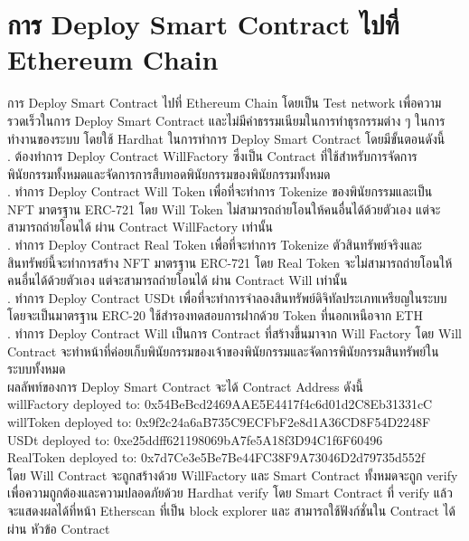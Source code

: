 \documentclass[12pt,oneside,openright,a4paper]{cpe-thai-project}
\begin{document}
\section{การ Deploy Smart Contract ไปที่ Ethereum Chain}
	\tab การ Deploy Smart Contract ไปที่ Ethereum Chain โดยเป็น Test network เพื่อความรวดเร็วในการ Deploy Smart Contract และไม่มีค่าธรรมเนียมในการทำธุรกรรมต่าง ๆ ในการทำงานของระบบ โดยใช้ Hardhat ในการทำการ Deploy Smart Contract โดยมีขั้นตอนดังนี้
	\\. ต้องทำการ Deploy Contract WillFactory ซึ่งเป็น Contract ที่ใช้สำหรับการจัดการพินัยกรรมทั้งหมดและจัดการการสืบทอดพินัยกรรมของพินัยกรรมทั้งหมด
	\\. ทำการ Deploy Contract Will Token เพื่อที่จะทำการ Tokenize ของพินัยกรรมและเป็น NFT มาตรฐาน ERC-721 โดย Will Token ไม่สามารถถ่ายโอนให้คนอื่นได้ด้วยตัวเอง แต่จะสามารถถ่ายโอนได้ ผ่าน Contract WillFactory เท่านั้น
	\\. ทำการ Deploy Contract Real Token เพื่อที่จะทำการ Tokenize ตัวสินทรัพย์จริงและสินทรัพย์นี้จะทำการสร้าง NFT มาตรฐาน ERC-721 โดย Real Token จะไม่สามารถถ่ายโอนให้คนอื่นได้ด้วยตัวเอง แต่จะสามารถถ่ายโอนได้ ผ่าน Contract Will เท่านั้น
	\\. ทำการ Deploy Contract USDt เพื่อที่จะทำการจำลองสินทรัพย์ดิจิทัลประเภทเหรียญในระบบ โดยจะเป็นมาตรฐาน ERC-20 ใช้สำรองทดสอบการฝากด้วย Token ที่นอกเหนือจาก ETH
	\\. ทำการ Deploy Contract Will เป็นการ Contract ที่สร้างขึ้นมาจาก Will Factory โดย Will Contract จะทำหน้าที่ค่อยเก็บพินัยกรรมของเจ้าของพินัยกรรมและจัดการพินัยกรรมสินทรัพย์ในระบบทั้งหมด
\\\tab 	ผลลัพท์ของการ Deploy Smart Contract จะได้ Contract Address ดังนี้
\\\tab willFactory deployed to: 0x54BeBcd2469AAE5E4417f4c6d01d2C8Eb31331cC
\\\tab willToken deployed to: 0x9f2c24a6aB735C9ECFbF2e8d1A36CD8F54D2248F 
\\\tab USDt deployed to: 0xe25ddff621198069bA7fe5A18f3D94C1f6F60496 
\\\tab RealToken deployed to: 0x7d7Ce3e5Be7Be44FC38F9A73046D2d79735d552f
\\\tab โดย Will Contract จะถูกสร้างด้วย WillFactory และ Smart Contract ทั้งหมดจะถูก verify เพื่อความถูกต้องและความปลอดภัยด้วย Hardhat verify โดย Smart Contract ที่ verify แล้วจะแสดงผลได้ที่หน้า Etherscan ที่เป็น block explorer และ สามารถใช้ฟังก์ชั่นใน Contract  ได้ผ่าน หัวข้อ Contract 
\end{document}
